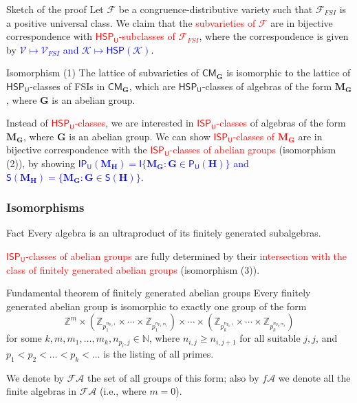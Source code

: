 \documentclass[professionalfont, handout, 10pt]{beamer} %
\theoremstyle{plain}
\theoremstyle{definition}
\newcommand{\m}[1]{{\mathbf {#1} }}
\begin{document}
\begin{frame}{Sketch of the proof}
    Let $\mathcal{F}$ be a congruence-distributive variety such that $\mathcal{F}_{FSI}$ is a positive universal class.
    We claim that the \textcolor{red}{subvarieties of $\mathcal{F}$} are in bijective correspondence with \textcolor{red}{$\mathsf{HSP_U}$-subclasses of $\mathcal{F}_{FSI}$}, where the correspondence is given by 
    \textcolor{blue}{$\mathcal{V} \mapsto \mathcal{V}_{FSI}$ and $\mathcal{K} \mapsto \mathsf{HSP}(\mathcal{K})$}.\pause
    \begin{block}{Isomorphism (1)}
        The lattice of subvarieties of $\mathsf{CM}_{\mathbf{G}}$ is isomorphic to the lattice of  $\mathsf{HSP_U}$-classes of FSIs in $\mathsf{CM}_{\mathbf{G}}$, which are $\mathsf{HSP_U}$-classes of algebras of the form $\m{M}_{\m{G}}$, where $\m{G}$ is an abelian group.
    \end{block}
    \pause
    Instead of \textcolor{red}{$\mathsf{HSP_U}$-classes}, we are interested in \textcolor{red}{$\mathsf{ISP_U}$-classes} of algebras of the form $\m{M}_{\m{G}}$, where $\m{G}$ is an abelian group.\pause
    We can show \textcolor{red}{$\mathsf{ISP_U}$-classes of $\m M_{\m G}$} are in bijective correspondence with the \textcolor{red}{$\mathsf{ISP_U}$-classes of abelian groups} (isomorphism (2)), by showing \textcolor{blue}{$\mathsf{IP_U}(\m{M}_{\m{H}})=\mathsf{I}\{\m{M}_{\m{G}}: \m{G} \in \mathsf{P_U}(\m{H})\}$ and $\mathsf{S}(\m{M}_{\m{H}})=\{\m{M}_{\m{G}}:  \m{G} \in \mathsf{S}(\m{H})\}$.}
\end{frame}

\begin{frame}
\frametitle{Isomorphisms}
    \begin{block}{Fact}
        Every algebra is an ultraproduct of its finitely generated subalgebras.
    \end{block}
    \textcolor{red}{$\mathsf{ISP_U}$-classes of abelian groups} are fully determined by their \textcolor{red}{intersection with the class of finitely generated abelian groups} (isomorphism (3)).\pause

    \begin{block}{Fundamental theorem of finitely generated abelian groups}
        Every finitely generated abelian group is isomorphic to exactly one group of the form
        \[
            \mathbb{Z}^m \times (\mathbb{Z}_{p_1^{n_{p_1, 1}}} \times \cdots \times \mathbb{Z}_{p_1^{n_{p_1,m_1}}}) \times \cdots \times (\mathbb{Z}_{p_k^{n_{p_k, 1}}} \times \cdots \times \mathbb{Z}_{p_k^{n_{p_k,m_k}}})  
        \]
        for some $k, m, m_1, \dots, m_k,n_{p_i,j} \in \mathbb{N}$, where $n_{i,j} \geq n_{i,j+1}$ for all suitable $j,j$, and $p_1 < p_2< \dots < p_k < \ldots $ is the listing of all primes.
    \end{block}
    We denote by $\mathcal{FA}$ the set of all groups of this form; also by $f\mathcal{A}$ we denote all the finite algebras in $\mathcal{FA}$ (i.e., where $m=0$).
\end{frame}
\end{document}
